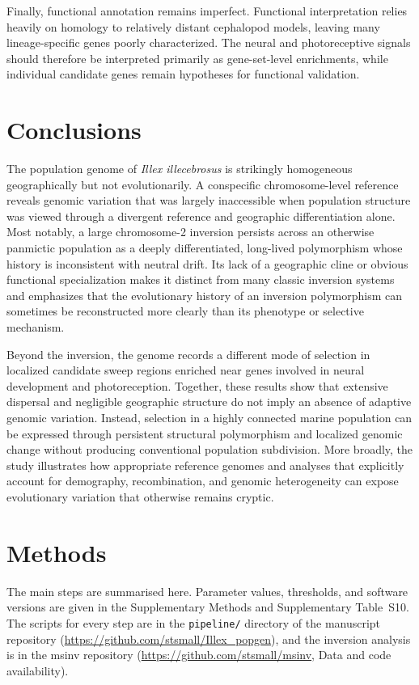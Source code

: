 \documentclass[11pt]{article}
\newcommand{\illex}{\textit{Illex illecebrosus}}
\begin{document}
Finally, functional annotation remains imperfect. Functional interpretation relies heavily on homology to relatively distant cephalopod models, leaving many lineage-specific genes poorly characterized. The neural and photoreceptive signals should therefore be interpreted primarily as gene-set-level enrichments, while individual candidate genes remain hypotheses for functional validation.

\section{Conclusions}

The population genome of \illex{} is strikingly homogeneous geographically but not evolutionarily. A conspecific chromosome-level reference reveals genomic variation that was largely inaccessible when population structure was viewed through a divergent reference and geographic differentiation alone. Most notably, a large chromosome-2 inversion persists across an otherwise panmictic population as a deeply differentiated, long-lived polymorphism whose history is inconsistent with neutral drift. Its lack of a geographic cline or obvious functional specialization makes it distinct from many classic inversion systems and emphasizes that the evolutionary history of an inversion polymorphism can sometimes be reconstructed more clearly than its phenotype or selective mechanism.

Beyond the inversion, the genome records a different mode of selection in localized candidate sweep regions enriched near genes involved in neural development and photoreception. Together, these results show that extensive dispersal and negligible geographic structure do not imply an absence of adaptive genomic variation. Instead, selection in a highly connected marine population can be expressed through persistent structural polymorphism and localized genomic change without producing conventional population subdivision. More broadly, the study illustrates how appropriate reference genomes and analyses that explicitly account for demography, recombination, and genomic heterogeneity can expose evolutionary variation that otherwise remains cryptic.

\section{Methods}\label{sec:methods}
The main steps are summarised here. Parameter values, thresholds, and software versions are given in the Supplementary Methods and Supplementary Table~S10. The scripts for every step are in the \texttt{pipeline/} directory of the manuscript repository (\url{https://github.com/stsmall/Illex_popgen}), and the inversion analysis is in the msinv repository (\url{https://github.com/stsmall/msinv}, Data and code availability).
\end{document}
